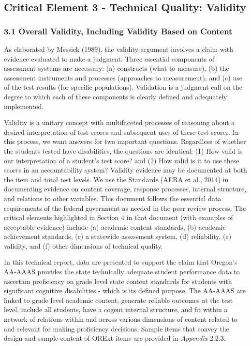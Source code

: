 \documentclass[]{article}
\title{}
\author{}
\date{}
\begin{document}
{
\setcounter{tocdepth}{5}
\tableofcontents
}
\hypertarget{critical-element-3---technical-quality-validity}{%
\subsection{Critical Element 3 - Technical Quality:
Validity}\label{critical-element-3---technical-quality-validity}}

\hypertarget{overall-validity-including-validity-based-on-content}{%
\subsubsection{3.1 Overall Validity, Including Validity Based on
Content}\label{overall-validity-including-validity-based-on-content}}

As elaborated by Messick (1989), the validity argument involves a claim
with evidence evaluated to make a judgment. Three essential components
of assessment systems are necessary: (a) constructs (what to measure),
(b) the assessment instruments and processes (approaches to
measurement), and (c) use of the test results (for specific
populations). Validation is a judgment call on the degree to which each
of these components is clearly defined and adequately implemented.

Validity is a unitary concept with multifaceted processes of reasoning
about a desired interpretation of test scores and subsequent uses of
these test scores. In this process, we want answers for two important
questions. Regardless of whether the students tested have disabilities,
the questions are identical: (1) How valid is our interpretation of a
student's test score? and (2) How valid is it to use these scores in an
accountability system? Validity evidence may be documented at both the
item and total test levels. We use the Standards (AERA et al., 2014) in
documenting evidence on content coverage, response processes, internal
structure, and relations to other variables. This document follows the
essential data requirements of the federal government as needed in the
peer review process. The critical elements highlighted in Section 4 in
that document (with examples of acceptable evidence) include (a)
academic content standards, (b) academic achievement standards, (c) a
statewide assessment system, (d) reliability, (e) validity, and (f)
other dimensions of technical quality.

In this technical report, data are presented to support the claim that
Oregon's AA-AAAS provides the state technically adequate student
performance data to ascertain proficiency on grade level state content
standards for students with significant cognitive disabilities - which
is its defined purpose. The AA-AAAS are linked to grade level academic
content, generate reliable outcomes at the test level, include all
students, have a cogent internal structure, and fit within a network of
relations within and across various dimensions of content related to and
relevant for making proficiency decisions. Sample items that convey the
design and sample content of ORExt items are provided in \emph{Appendix}
2.2.3.
\end{document}
